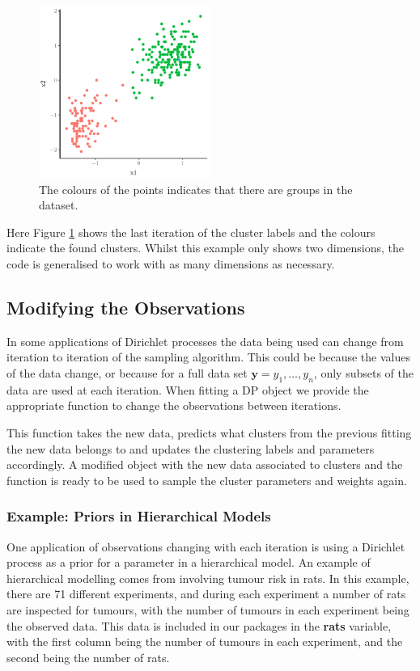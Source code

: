 \documentclass[nojss]{jss}
\begin{document}
\begin{figure}[tb]
  \centering
	\includegraphics[width=0.5\textwidth]{img/faithful_multi_plot.pdf}
	\caption{The colours of the points indicates that there are groups in the  dataset.}
	\label{fig:clustering}
\end{figure}

Here Figure \ref{fig:clustering} shows the last iteration of the cluster labels and the colours indicate the found clusters. Whilst this example only shows two dimensions, the code is generalised to work with as many dimensions as necessary.


\subsection{Modifying the Observations}
In some applications of Dirichlet processes the data being used can change from iteration to iteration of the sampling algorithm. This could be because the values of the data change, or because for a full data set $\mathbf{y} = y_1 , \ldots , y_n$, only subsets of the data are used at each iteration. When fitting a DP object we provide the appropriate function  to change the observations between iterations.

This function takes the new data, predicts what clusters from the previous fitting the new data belongs to and updates the clustering labels and parameters accordingly. A modified object with the new data associated to clusters and the function  is ready to be used to sample the cluster parameters and weights again.

\subsubsection{Example: Priors in Hierarchical Models}
One application of observations changing with each iteration is using a Dirichlet process as a prior for a parameter in a hierarchical model. An example of hierarchical modelling comes from \cite{gelman_bayesian_2014} involving tumour risk in rats. In this example, there are 71 different experiments, and during each experiment a number of rats are inspected for tumours, with the number of tumours in each experiment being the observed data. This data is included in our packages in the \textbf{rats} variable, with the first column being the number of tumours in each experiment, and the second being the number of rats.
\end{document}
